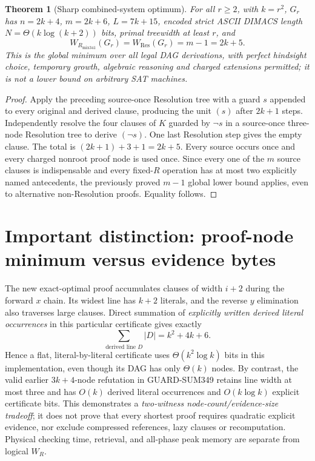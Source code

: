 \documentclass[11pt]{article}
\newtheorem{theorem}{Theorem}
\begin{document}
\begin{theorem}[Sharp combined-system optimum]
For all $r\ge2$, with $k=r^2$, $G_r$ has
$n=2k+4$, $m=2k+6$, $L=7k+15$, encoded strict ASCII DIMACS length $N=\Theta(k\log(k+2))$ bits, primal treewidth at least $r$, and
\[
\boxed{W_{R_{\mathrm{mix341}}}(G_r)=W_{\mathrm{Res}}(G_r)=m-1=2k+5.}
\]
This is the \emph{global} minimum over all legal DAG derivations, with perfect hindsight choice, temporary growth, algebraic reasoning and charged extensions permitted; it is not a lower bound on arbitrary SAT machines.
\end{theorem}
\begin{proof}
Apply the preceding source-once Resolution tree with a guard $s$ appended to every original and derived clause, producing the unit $(s)$ after $2k+1$ steps. Independently resolve the four clauses of $K$ guarded by $\neg s$ in a source-once three-node Resolution tree to derive $(\neg s)$. One last Resolution step gives the empty clause. The total is $(2k+1)+3+1=2k+5$. Every source occurs once and every charged nonroot proof node is used once. Since every one of the $m$ source clauses is indispensable and every fixed-$R$ operation has at most two explicitly named antecedents, the previously proved $m-1$ global lower bound applies, even to alternative non-Resolution proofs. Equality follows.
\end{proof}

\section*{Important distinction: proof-node minimum versus evidence bytes}
The new exact-optimal proof accumulates clauses of width $i+2$ during the forward $x$ chain. Its widest line has $k+2$ literals, and the reverse $y$ elimination also traverses large clauses. Direct summation of \emph{explicitly written derived literal occurrences} in this particular certificate gives exactly
\[
\boxed{\sum_{\text{derived line }D}|D|=k^2+4k+6.}
\]
Hence a flat, literal-by-literal certificate uses $\Theta(k^2\log k)$ bits in this implementation, even though its DAG has only $\Theta(k)$ nodes. By contrast, the valid earlier $3k+4$-node refutation in GUARD-SUM349 retains line width at most three and has $O(k)$ derived literal occurrences and $O(k\log k)$ explicit certificate bits. This demonstrates a \emph{two-witness node-count/evidence-size tradeoff}; it does not prove that every shortest proof requires quadratic explicit evidence, nor exclude compressed references, lazy clauses or recomputation. Physical checking time, retrieval, and all-phase peak memory are separate from logical $W_R$.
\end{document}
